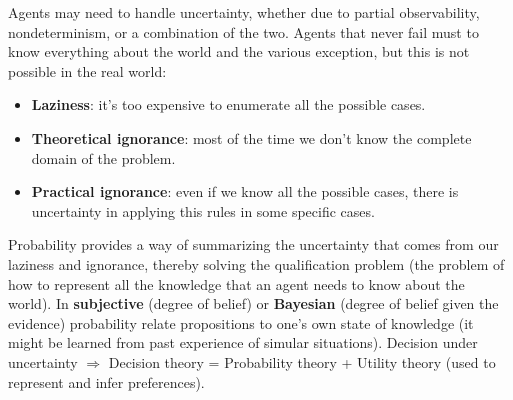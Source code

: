 \documentclass[12pt]{article}
\begin{document}
Agents may need to handle uncertainty, whether due to partial observability, nondeterminism, or a combination of the two.
Agents that never fail must to know everything about the world and the various exception, but this is not possible in the real world:
\begin{itemize}
    \item \textbf{Laziness}: it's too expensive to enumerate all the possible cases.
    \item \textbf{Theoretical ignorance}: most of the time we don't know the complete domain of the problem.
    \item \textbf{Practical ignorance}: even if we know all the possible cases, there is uncertainty in applying this rules in some specific cases.
\end{itemize}
Probability provides a way of summarizing the uncertainty that comes from our laziness and ignorance,
thereby solving the qualification problem (the problem of how to represent all the knowledge that an agent needs to know about the world).
In \textbf{subjective} (degree of belief) or \textbf{Bayesian} (degree of belief given the evidence) probability relate propositions to 
one's own state of knowledge (it might be learned from past experience of simular situations).
Decision under uncertainty $\Rightarrow$ Decision theory = Probability theory + Utility theory (used to represent and infer preferences).
\end{document}

